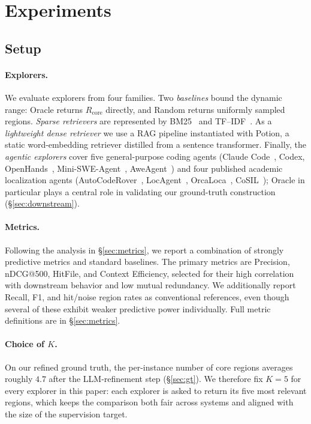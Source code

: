  
\section{Experiments}

 
\subsection{Setup}

 
\paragraph{Explorers.}
We evaluate explorers from four families. Two \emph{baselines} bound the dynamic range: Oracle returns $R_{\text{core}}$ directly, and Random returns uniformly sampled regions. \emph{Sparse retrievers} are represented by BM25~\citep{robertson2009bm25} and TF--IDF~\citep{salton1988termweighting}. As a \emph{lightweight dense retriever} we use a RAG pipeline instantiated with Potion, a static word-embedding retriever distilled from a sentence transformer. Finally, the \emph{agentic explorers} cover five general-purpose coding agents (Claude Code~\citep{anthropic2025claudecode}, Codex, OpenHands~\citep{wang2024openhands}, Mini-SWE-Agent~\citep{yang2024sweagent}, AweAgent~\citep{chen2026beyondswecurrentcodeagent}) and four published academic localization agents (AutoCodeRover~\citep{zhang2024autocoderover}, LocAgent~\citep{chen2025locagent}, OrcaLoca~\citep{yu2025orcaloca}, CoSIL~\citep{jiang2025issuelocalizationllmdriveniterative}); Oracle in particular plays a central role in validating our ground-truth construction (\S\ref{sec:downstream}).


 
\paragraph{Metrics.} Following the analysis in \S\ref{sec:metrics}, we report a combination of strongly predictive metrics and standard baselines. The primary metrics are Precision, nDCG@500, HitFile, and Context Efficiency, selected for their high correlation with downstream behavior and low mutual redundancy. We additionally report Recall, F1, and hit/noise region rates as conventional references, even though several of these exhibit weaker predictive power individually. Full metric definitions are in \S\ref{sec:metrics}.

 
\paragraph{Choice of $K$.}
On our refined ground truth, the per-instance number of core regions averages roughly $4.7$ after the LLM-refinement step (\S\ref{sec:gt}). We therefore fix $K{=}5$ for every explorer in this paper: each explorer is asked to return its five most relevant regions, which keeps the comparison both fair across systems and aligned with the size of the supervision target.
















